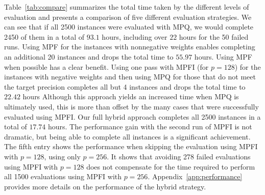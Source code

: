 \documentclass[letterpaper,USenglish,cleveref, autoref, thm-restate]{lipics-v2021}
\begin{document}
\begin{table}
  \caption{Performance Comparison of Different Implementation Strategies.  Run entries of the form $S$+$F$ indicate that $S$ runs
  were successful and $F$ runs either ran out of memory or failed to meet the target precision.  The strategy yielding the least total time is shown in red.}
  \label{tab:compare}
\end{table}

Table~\ref{tab:compare} summarizes the total time taken by the
different levels of evaluation and presents a comparison of five
different evaluation strategies.  We can see that if all 2500
instances were evaluated with MPQ, we would complete 2450 of them in a
total of $93.1$ hours, including over $22$ hours for the 50 failed
runs.  Using MPF
for the instances with nonnegative weights enables completing an
additional 20 instances and drops the total time to $55.97$ hours.
Using MPF when
possible has a clear benefit.  Using one pass with MPFI (for $p=128$)
for the instances with negative weights and then using MPQ for those
that do not meet the target precision completes all but 4 instances
and drops the total time to $22.42$ hours
Although this approach yields an
increased time when MPQ is ultimately used, this is more than offset
by the many cases that were successfully evaluated using MPFI\@.  Our
full hybrid approach completes all 2500 instances in a total of
$17.74$ hours.
The performance gain with the second run of MPFI is not dramatic, but
being able to complete all instances is a significant achievement.
The fifth entry shows the performance when skipping the
evaluation using MPFI with $p=128$, using only $p=256$.  It shows
that avoiding 278 failed evaluations using MPFI with $p=128$ does not
compensate for the time required to perform all 1500 evaluations using
MPFI with $p=256$.  Appendix~\ref{app:performance} provides more
details on the performance of the hybrid strategy.
\end{document}
